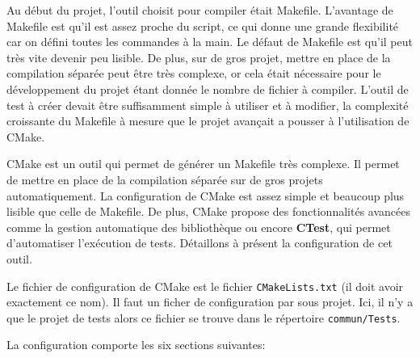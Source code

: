 \documentclass[a4paper]{article}
\begin{document}
Au début du projet, l'outil choisit pour compiler était Makefile. L'avantage de
Makefile est qu'il est assez proche du script, ce qui donne une grande
flexibilité car on défini toutes les commandes à la main. Le défaut de Makefile
est qu'il peut très vite devenir peu lisible. De plus, sur de gros projet, mettre
en place de la compilation séparée peut être très complexe, or cela était
nécessaire pour le développement du projet étant donnée le nombre de fichier à
compiler. L'outil de test à créer devait être suffisamment simple à utiliser et à
modifier, la complexité croissante du Makefile à mesure que le projet avançait a
pousser à l'utilisation de CMake.

CMake est un outil qui permet de générer un Makefile très complexe. Il permet de
mettre en place de la compilation séparée sur de gros projets automatiquement.
La configuration de CMake est assez simple et beaucoup plus lisible que celle de
Makefile. De plus, CMake propose des fonctionnalités avancées comme la gestion
automatique des bibliothèque ou encore \textbf{CTest}, qui permet d'automatiser
l'exécution de tests. Détaillons à présent la configuration de cet outil.

Le fichier de configuration de CMake est le fichier \verb|CMakeLists.txt|
(il doit avoir exactement ce nom). Il faut un ficher de configuration par sous
projet. Ici, il n'y a que le projet de tests alors ce fichier se trouve dans le
répertoire \verb|commun/Tests|.

La configuration comporte les six sections suivantes:
\end{document}
